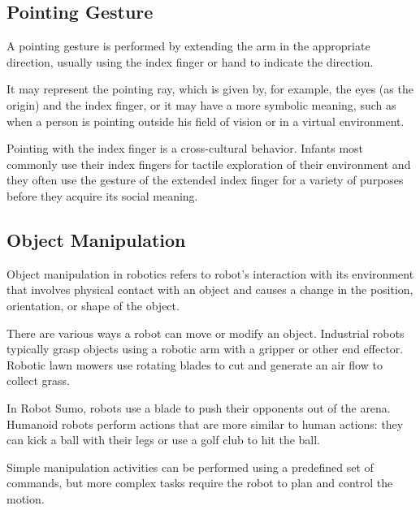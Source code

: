 \subsection{Pointing Gesture}
A pointing gesture is performed by extending the arm in the appropriate
direction, usually using the index finger or hand to indicate the direction.\par
It may represent the pointing ray, which is given by, for example,
the eyes (as the origin) and the index finger, or it may have a more symbolic
meaning, such as when a person is pointing outside his field of vision or in a virtual environment.\par
Pointing with the index finger is a cross-cultural behavior. Infants most commonly use their index fingers for tactile exploration of their environment and they often use the gesture of the extended
index finger for a variety of purposes before they acquire its social meaning.\par

\subsection{Object Manipulation}
Object manipulation in robotics refers to robot's interaction with its environment that involves physical contact with an object and causes a change in the position, orientation, or shape of the object.\par
There are various ways a robot can move or modify an object. Industrial robots typically grasp objects using a robotic arm with a gripper or other end effector. Robotic lawn mowers use rotating blades to cut and generate an air flow to collect grass.\par
In Robot Sumo, robots use a blade to push their opponents out of the arena. Humanoid robots perform actions that are more similar to human actions: they can kick a ball with their legs or use a golf club to hit the ball.\par

Simple manipulation activities can be performed using a predefined set of commands, but more complex tasks require the robot to plan and control the motion.\par

